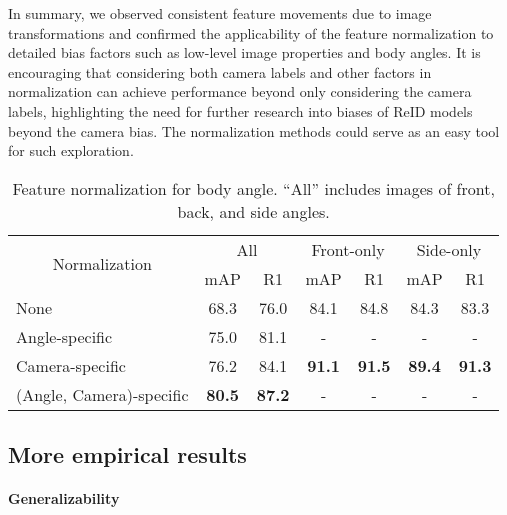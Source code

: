 In summary, we observed consistent feature movements due to image transformations and confirmed the applicability of the feature normalization to detailed bias factors such as low-level image properties and body angles.
It is encouraging that considering both camera labels and other factors in normalization can achieve performance beyond only considering the camera labels, highlighting the need for further research into biases of ReID models beyond the camera bias. 
The normalization methods could serve as an easy tool for such exploration.



\begin{table}[t]
\centering
\vspace{-10pt}
    \caption{
    Feature normalization for body angle.
    ``All'' includes images of front, back, and side angles.
    }
    \label{tab:angle_norm}
    {
    \scriptsize
    \renewcommand{\arraystretch}{1.1}
    \begin{tabular}{l|cc|cc|cc}
        \hline
        \multicolumn{1}{c|}{\multirow{2}{*}{Normalization}} & 
        \multicolumn{2}{c|}{All} & 
        \multicolumn{2}{c|}{Front-only} & 
        \multicolumn{2}{c}{Side-only} \\

        \cline{2-7}
        \multicolumn{1}{c|}{} & 
        mAP & R1 & mAP & R1 & mAP & R1 \\ 
        \hline \hline
        
        None  & 68.3 & 76.0 & 84.1 & 84.8 & 84.3 & 83.3 \\
        \hline
        Angle-specific  & 75.0 & 81.1 & - & - & - & - \\
        Camera-specific  & 76.2 & 84.1 & \textbf{91.1} & \textbf{91.5} & \textbf{89.4} & \textbf{91.3} \\
        (Angle, Camera)-specific  & \textbf{80.5} & \textbf{87.2} & - & - & - & - \\
        \hline
    \end{tabular}
    }
\end{table}


\subsection{More empirical results}

\paragraph{Generalizability}

